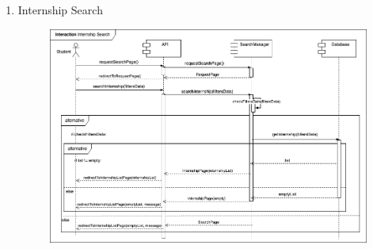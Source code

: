 \begin{enumerate}
    \newpage
    \item Internship Search
    \begin{figure}[h!]
            \centering  \includegraphics[width=1\textwidth]{DD/Images/Interactions/INT05_InternshipSearch.drawio.png}
            \label{fig:ComponentViewDiagram}
    \end{figure}
    
\end{enumerate}